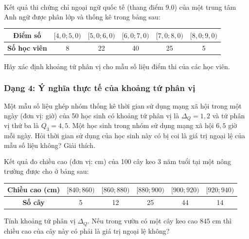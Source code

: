 \documentclass[12pt]{article}
\begin{document}
	\begin{btdo}[title={Bài 6}]
		Kết quả thi chứng chỉ ngoại ngữ quốc tế (thang điểm 9.0) của một trung tâm Anh ngữ được phân lớp và thống kê trong bảng sau:
		\begin{center}
			\renewcommand{\arraystretch}{1.3}
			\begin{tabular}{|c|c|c|c|c|c|}
				\hline
				\textbf{Điểm số} & $[4,0; 5,0)$ & $[5,0; 6,0)$ & $[6,0; 7,0)$ & $[7,0; 8,0)$ & $[8,0; 9,0)$ \\
				\hline
				\textbf{Số học viên} & 8 & 22 & 40 & 25 & 5 \\
				\hline
			\end{tabular}
		\end{center}
		Hãy xác định khoảng tứ phân vị cho mẫu số liệu điểm thi của các học viên.
	\end{btdo}
	
	\subsubsection{Dạng 4: Ý nghĩa thực tế của khoảng tứ phân vị}
	
	\begin{btxanh}[title={Bài 1}]
		Một mẫu số liệu ghép nhóm thống kê thời gian sử dụng mạng xã hội trong một ngày (đơn vị: giờ) của 50 học sinh có khoảng tứ phân vị là $\Delta_Q = 1,2$ và tứ phân vị thứ ba là $Q_3 = 4,5$. 
		Một học sinh trong nhóm sử dụng mạng xã hội $6,5$ giờ mỗi ngày. Hỏi thời gian sử dụng của học sinh này có bị coi là giá trị ngoại lệ của mẫu số liệu không? Giải thích.
	\end{btxanh}
	
	\begin{btxanh}[title={Bài 2}]
		Kết quả đo chiều cao (đơn vị: cm) của 100 cây keo 3 năm tuổi tại một nông trường được cho ở bảng sau:
		\begin{center}
			\renewcommand{\arraystretch}{1.3}
			\begin{tabular}{|c|c|c|c|c|c|}
				\hline
				\textbf{Chiều cao (cm)} & $[840; 860)$ & $[860; 880)$ & $[880; 900)$ & $[900; 920)$ & $[920; 940)$ \\
				\hline
				\textbf{Số cây} & 5 & 12 & 25 & 44 & 14 \\
				\hline
			\end{tabular}
		\end{center}
		Tính khoảng tứ phân vị $\Delta_Q$. Nếu trong vườn có một cây keo cao $845$ cm thì chiều cao của cây này có phải là giá trị ngoại lệ không?
	\end{btxanh}
	
\end{document}
